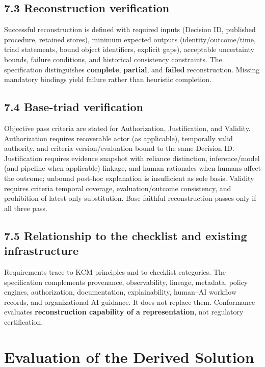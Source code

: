 \documentclass[11pt,a4paper]{article}
\begin{document}
\subsection{7.3 Reconstruction verification}

Successful reconstruction is defined with required inputs (Decision ID, published procedure, retained stores), minimum expected outputs (identity/outcome/time, triad statements, bound object identifiers, explicit gaps), acceptable uncertainty bounds, failure conditions, and historical consistency constraints. The specification distinguishes \textbf{complete}, \textbf{partial}, and \textbf{failed} reconstruction. Missing mandatory bindings yield failure rather than heuristic completion.


\subsection{7.4 Base-triad verification}

Objective pass criteria are stated for Authorization, Justification, and Validity. Authorization requires recoverable actor (as applicable), temporally valid authority, and criteria version/evaluation bound to the same Decision ID. Justification requires evidence snapshot with reliance distinction, inference/model (and pipeline when applicable) linkage, and human rationales when humans affect the outcome; unbound post-hoc explanation is insufficient as sole basis. Validity requires criteria temporal coverage, evaluation/outcome consistency, and prohibition of latest-only substitution. Base faithful reconstruction passes only if all three pass.


\subsection{7.5 Relationship to the checklist and existing infrastructure}

Requirements trace to KCM principles and to checklist categories. The specification complements provenance, observability, lineage, metadata, policy engines, authorization, documentation, explainability, human--AI workflow records, and organizational AI guidance. It does not replace them. Conformance evaluates \textbf{reconstruction capability of a representation}, not regulatory certification.



\section{Evaluation of the Derived Solution}
\end{document}
